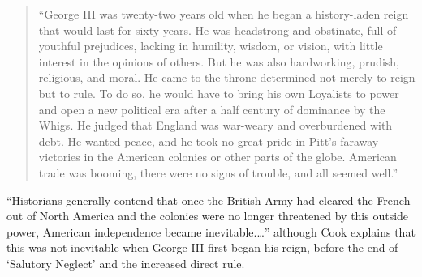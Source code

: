 \begin{quote}
``George III was twenty-two years old when he began a history-laden reign that
would last for sixty years. He was headstrong and obstinate, full of youthful
prejudices, lacking in humility, wisdom, or vision, with little interest in the
opinions of others. But he was also hardworking, prudish, religious, and moral.
He came to the throne determined not merely to reign but to rule. To do so, he
would have to bring his own Loyalists to power and open a new political era
after a half century of dominance by the Whigs. He judged that England was
war-weary and overburdened with debt. He wanted peace, and he took no great
pride in Pitt's faraway victories in the American colonies or other parts of the
globe. American trade was booming, there were no signs of trouble, and all
seemed well.'' \cite[5]{cook_long_1995}
\end{quote}
%
%
%
%

%

``Historians generally contend that once the British Army had cleared the French
out of North America and the colonies were no longer threatened by this outside
power, American independence became inevitable.\ldots'' although Cook explains
that this was not inevitable when George III first began his reign, before the
end of `Salutory Neglect' and the increased direct rule.\cite[p. 5]{cook_long_1995} 

%

